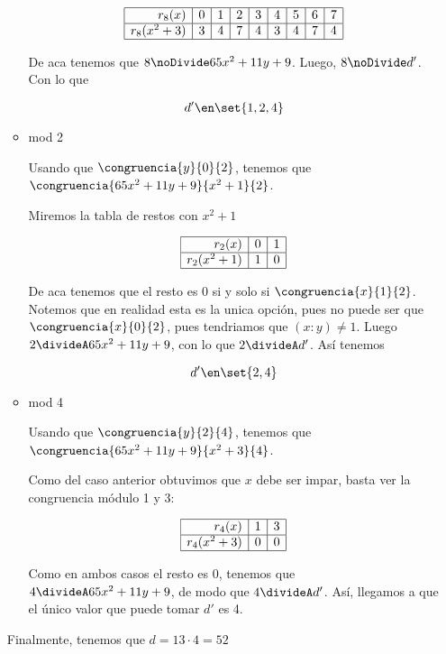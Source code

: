 \begin{enumerate}[label=(\alph*)]
\begin{itemize}
          $$
            \begin{array}{|r|c|c|c|c|c|c|c|c|}
              \hline
              r_8(x)     & 0 & 1 & 2 & 3 & 4 & 5 & 6 & 7 \\ \hline
              r_8(x^2+3) & 3 & 4 & 7 & 4 & 3 & 4 & 7 & 4 \\ \hline
            \end{array}
           $$

           De aca tenemos que $8 \noDivide 65x^2+ 11y +9$. Luego, $8 \noDivide d'$. Con lo que 

           $$
           d' \en \set{1,2,4}
           $$

           \item mod 2

          Usando que $\congruencia{y}{0}{2}$, tenemos que $\congruencia{65x^2+ 11y +9}{x^2+1}{2}$. \bigskip

          Miremos la tabla de restos con $x^2+1$

          $$
            \begin{array}{|r|c|c|}
              \hline
              r_2(x)     & 0 & 1 \\ \hline
              r_2(x^2+1) & 1 & 0 \\ \hline
            \end{array}
           $$

           De aca tenemos que el resto es 0 si y solo si $\congruencia{x}{1}{2}$. Notemos que en realidad esta es la unica opción, 
           pues no puede ser que $\congruencia{x}{0}{2}$, pues tendriamos que $(x:y) \neq 1$. Luego $2 \divideA 65x^2+ 11y +9$, 
           con lo que $2 \divideA d'$. Así tenemos

           $$
           d' \en \set{2,4}
           $$

           \item mod 4

           Usando que $\congruencia{y}{2}{4}$, tenemos que $\congruencia{65x^2+ 11y +9}{x^2+3}{4}$. \bigskip

           Como del caso anterior obtuvimos que $x$ debe ser impar, basta ver la congruencia módulo 1 y 3:

           $$
            \begin{array}{|r|c|c|}
              \hline
              r_4(x)     & 1 & 3 \\ \hline
              r_4(x^2+3) & 0 & 0 \\ \hline
            \end{array}
           $$
           
           Como en ambos casos el resto es 0, tenemos que $4 \divideA 65x^2+ 11y +9$, de modo que $4 \divideA d'$. Así, llegamos a que 
           el único valor que puede tomar $d'$ es 4. \bigskip

          \end{itemize}
        
        Finalmente, tenemos que $d=13 \cdot 4= \boxed{52}$
    
        \end{enumerate}

